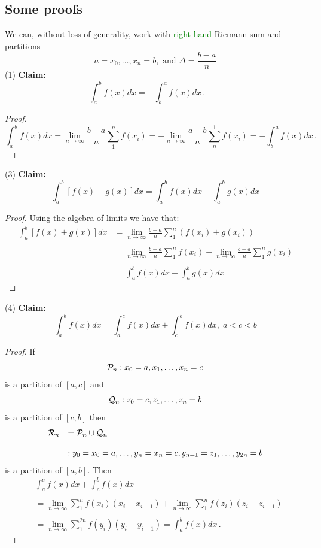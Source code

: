 \documentclass{article}
\begin{document}
\subsection{Some proofs}
We can, without loss of generality, work with \textcolor{green}{right-hand} Riemann sum and partitions
$$
a=x_0, \ldots, x_n = b, \mbox{    and   } \Delta = \frac{b-a}{n}
$$
(1) \textbf{Claim:}
$$
\int_a^b f(x) dx = -\int_b^a f(x) dx\,. \qquad
$$
\begin{proof}
{\small 
$$
\int_a^b f(x) dx = \lim_{n \rightarrow \infty} \frac{b-a}{n} \sum_1^n f(x_i) = - \lim_{n \rightarrow \infty} \frac{a-b}{n} \sum_n^1 f(x_i) = -\int_b^a f(x) dx\,.
$$
}
\end{proof}
(3) \textbf{Claim:}
$$ \int_a^b [f(x)+g(x)] dx = \int_a^b f(x) dx + \int_a^b g(x)
dx $$
\begin{proof}
Using the algebra of limits we have that:
{\small 
$$
\begin{array}{ll}
 \displaystyle\int_a^b [f(x)+g(x)] dx & = \lim_{n \rightarrow \infty} \frac{b-a}{n} \sum_1^n \left(f(x_i)+g(x_i) \right) \\
\\
& =   \displaystyle\lim_{n \rightarrow \infty} \frac{b-a}{n} \sum_1^n f(x_i)+ \lim_{n \rightarrow \infty} \frac{b-a}{n} \sum_1^n g(x_i) \\
\\
& =  \displaystyle\int_a^b f(x) dx + \int_a^b g(x) dx
\end{array}
$$
}
\end{proof}
(4) \textbf{Claim:}
$$ \int_a^b f(x) dx = \int_a^c f(x) dx + \int_c^b f(x) dx, \;
a<c<b $$
\begin{proof}
If 
$${\cal P}_n: x_0 = a, x_1, \ldots, x_n = c
$$ 
is a partition of $[a, c]$ and 
$$
{\cal Q}_n: z_0 = c, z_1, \ldots, z_n = b
$$ 
is a partition of $[c, b]$ then
$$
\begin{array}{ll}
{\cal R}_n & = {\cal P}_n \cup {\cal Q}_n\\
\\
& : y_0 = x_0 = a, \ldots, y_n = x_n = c, y_{n+1} = z_1, \ldots, y_{2n} = b
\end{array}
$$
is a partition of $[a, b]$. Then
$$
\begin{array}{ll}
& \displaystyle \int_a^c f(x) dx + \int_c^b f(x) dx \\
\\
& =  \displaystyle\lim_{n \rightarrow \infty} \sum_1^n f(x_i) (x_i-x_{i-1})+ \lim_{n \rightarrow \infty} \sum_1^n f(z_i) (z_i-z_{i-1})\\
\\
& = \displaystyle \lim_{n \rightarrow \infty} \sum_1^{2n} f(y_i) (y_i-y_{i-1}) = \int_a^b f(x) dx\,.
\end{array}
$$
\end{proof}
\end{document}
